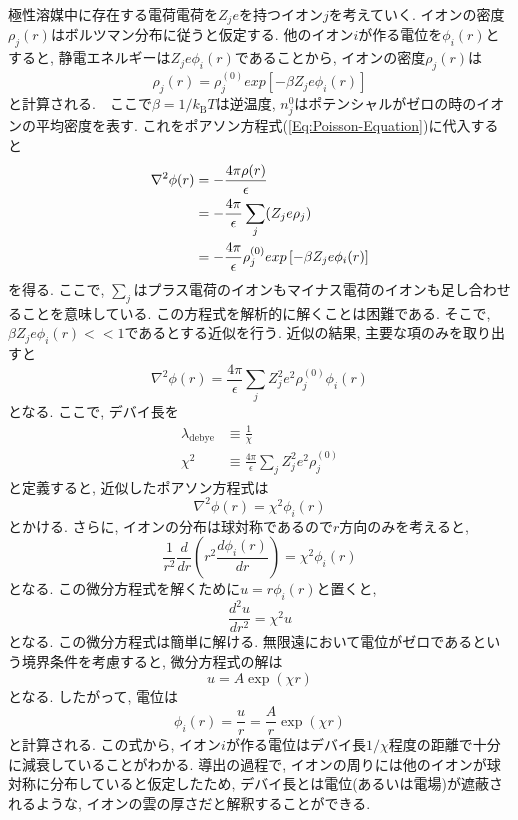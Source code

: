 極性溶媒中に存在する電荷電荷を$Z_{j} e$を持つイオン$j$を考えていく.
イオンの密度$\rho_{j}(r)$はボルツマン分布に従うと仮定する. 
他のイオン$i$が作る電位を$\phi_{i}(r)$とすると, 静電エネルギーは$Z_{j}e \phi_{i}(r)$であることから, イオンの密度$\rho_{j}(r)$は
\begin{equation}
    \rho_{j}(r) =
    \rho_{j}^{(0)} exp\left[-\beta Z_{j}e \phi_{i}(r)\right]
\end{equation}
と計算される.　ここで$\beta = 1/k_{\mathrm{B}}T$は逆温度, $n_{j}^{0}$はポテンシャルがゼロの時のイオンの平均密度を表す. 
これをポアソン方程式(\ref{Eq:Poisson-Equation})に代入すると
\begin{align}
    \nabla^{2} \phi(r)
    &=
    - \frac{4\pi\rho(r)}{\epsilon}
    \notag \\
    &=
    - \frac{4\pi}{\epsilon} \sum_{j}(Z_{j} e \rho_{j})
    \notag \\
    &=
    - \frac{4\pi}{\epsilon}
    \rho_{j}^{(0)} exp\left[-\beta Z_{j}e \phi_{i}(r)\right]
\end{align}
を得る. ここで, $\sum_{j}$はプラス電荷のイオンもマイナス電荷のイオンも足し合わせることを意味している. この方程式を解析的に解くことは困難である. そこで, $\beta Z_{j} e \phi_{i}(r) << 1$であるとする近似を行う. 近似の結果, 主要な項のみを取り出すと
\begin{equation}
    \nabla^{2} \phi(r)
    =
    \frac{4\pi}{\epsilon}
    \sum_{j} Z_{j}^{2} e^{2} \rho_{j}^{(0)} \phi_{i}(r)
\end{equation}
となる. ここで, デバイ長を
\begin{align}
    \lambda_{\mathrm{debye}} &\equiv \frac{1}{\chi} 
    \\
    \chi^{2} &\equiv 
    \frac{4\pi}{\epsilon}
    \sum_{j} Z_{j}^{2} e^{2} \rho_{j}^{(0)}
\end{align}
と定義すると, 近似したポアソン方程式は
\begin{equation}
    \nabla^{2} \phi(r) = \chi^{2} \phi_{i}(r)
\end{equation}
とかける. さらに, イオンの分布は球対称であるので$r$方向のみを考えると,
\begin{equation}
    \frac{1}{r^{2}} \frac{d}{dr}
    \left(
        r^{2}
        \frac{d\phi_{i}(r)}{dr}
    \right)
    =
    \chi^{2} \phi_{i}(r)
\end{equation}
となる. この微分方程式を解くために$u = r \phi_{i}(r)$と置くと,
\begin{equation}
    \frac{d^{2} u}{dr^{2}} = \chi^{2} u
\end{equation}
となる. この微分方程式は簡単に解ける.
無限遠において電位がゼロであるという境界条件を考慮すると, 微分方程式の解は
\begin{equation}
    u = A \exp(\chi r)
\end{equation}
となる. したがって, 電位は
\begin{equation}
    \phi_{i}(r) = \frac{u}{r} = \frac{A}{r} \exp(\chi r)
\end{equation}
と計算される. この式から, イオン$i$が作る電位はデバイ長$1/\chi$程度の距離で十分に減衰していることがわかる. 導出の過程で, イオンの周りには他のイオンが球対称に分布していると仮定したため, デバイ長とは電位(あるいは電場)が遮蔽されるような, イオンの雲の厚さだと解釈することができる.

